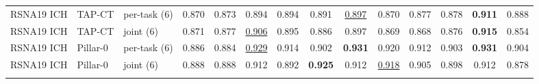 \begin{tabular}{lllccccccccccc}
\addlinespace[2pt]
RSNA19 ICH & TAP-CT & per-task (6) & 0.870 & 0.873 & 0.894 & 0.894 & \cellcolor{modebest}0.891 & \underline{0.897} & \cellcolor{modebest}0.870 & \cellcolor{modebest}0.877 & \cellcolor{modebest}0.878 & \textbf{0.911} & \cellcolor{modebest}0.888 \\
RSNA19 ICH & TAP-CT & joint (6) & \cellcolor{modebest}0.871 & \cellcolor{modebest}0.877 & \cellcolor{modebest}\underline{0.906} & \cellcolor{modebest}0.895 & 0.886 & 0.897 & 0.869 & 0.868 & 0.876 & \cellcolor{modebest}\textbf{0.915} & 0.854 \\
\addlinespace[2pt]
RSNA19 ICH & Pillar-0 & per-task (6) & 0.886 & 0.884 & \cellcolor{modebest}\underline{0.929} & \cellcolor{modebest}0.914 & 0.902 & \cellcolor{modebest}\textbf{0.931} & \cellcolor{modebest}0.920 & \cellcolor{modebest}0.912 & \cellcolor{modebest}0.903 & \cellcolor{modebest}\textbf{0.931} & \cellcolor{modebest}0.904 \\
RSNA19 ICH & Pillar-0 & joint (6) & \cellcolor{modebest}0.888 & \cellcolor{modebest}0.888 & 0.912 & 0.892 & \cellcolor{modebest}\textbf{0.925} & 0.912 & \underline{0.918} & 0.905 & 0.898 & 0.912 & 0.878 \\
\addlinespace[2pt]
\bottomrule
\end{tabular}
